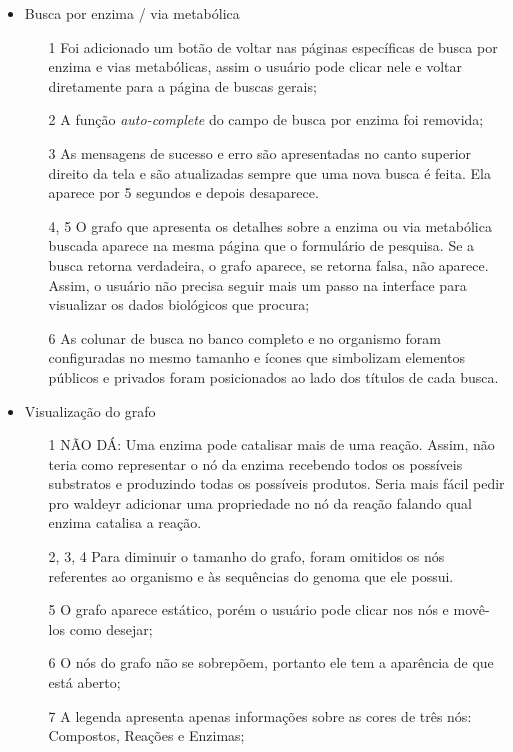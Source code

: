 \begin{itemize}
\item Busca por enzima / via metabólica
  \begin{itemize}
  \item[1] Foi adicionado um botão de voltar nas páginas específicas de busca por enzima e vias metabólicas, assim o usuário pode clicar nele e voltar diretamente para a página de buscas gerais;
  \item[2] A função \textit{auto-complete} do campo de busca por enzima foi removida;
  \item[3] As mensagens de sucesso e erro são apresentadas no canto superior direito da tela e são atualizadas sempre que uma nova busca é feita. Ela aparece por 5 segundos e depois desaparece.
  \item[4, 5] O grafo que apresenta os detalhes sobre a enzima ou via metabólica buscada aparece na mesma página que o formulário de pesquisa. Se a busca retorna verdadeira, o grafo aparece, se retorna falsa, não aparece. Assim, o usuário não precisa seguir mais um passo na interface para visualizar os dados biológicos que procura;
  \item[6] As colunar de busca no banco completo e no organismo foram configuradas no mesmo tamanho e ícones que simbolizam elementos públicos e privados foram posicionados ao lado dos títulos de cada busca.
  \end{itemize}
  
\item Visualização do grafo
  \begin{itemize} 
  \item[1] NÃO DÁ: Uma enzima pode catalisar mais de uma reação. Assim, não teria como representar o nó da enzima recebendo todos os possíveis substratos e produzindo todas os possíveis produtos. Seria mais fácil pedir pro waldeyr adicionar uma propriedade no nó da reação falando qual enzima catalisa a reação.
  \item[2, 3, 4] Para diminuir o tamanho do grafo, foram omitidos os nós referentes ao organismo e às sequências do genoma que ele possui.
  \item[5] O grafo aparece estático, porém o usuário pode clicar nos nós e movê-los como desejar;
  \item[6] O nós do grafo não se sobrepõem, portanto ele tem a aparência de que está aberto;
  \item[7] A legenda apresenta apenas informações sobre as cores de três nós: Compostos, Reações e Enzimas;
  \end{itemize}
\end{itemize}
 

